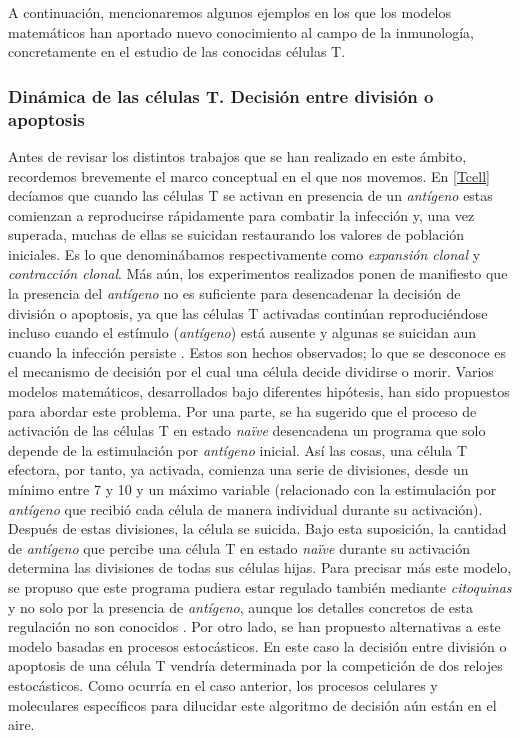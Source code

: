 A continuación, mencionaremos algunos ejemplos en los que los modelos matemáticos han aportado nuevo conocimiento al campo de la inmunología, concretamente en el estudio de las conocidas células T. 


\subsubsection{Dinámica de las células T. Decisión entre división o apoptosis}
\label{cuestionAmodelizar}

Antes de revisar los distintos trabajos que se han realizado en este ámbito, recordemos brevemente el marco conceptual en el que nos movemos. En \ref{Tcell} decíamos que cuando las células T se activan en presencia de un \textit{antígeno} estas comienzan a reproducirse rápidamente para combatir la infección y, una vez superada, muchas de ellas se suicidan restaurando los valores de población iniciales. Es lo que denominábamos respectivamente como \textit{expansión clonal} y \textit{contracción clonal}. Más aún, los experimentos realizados ponen de manifiesto que la presencia del \textit{antígeno} no es suficiente para desencadenar la decisión de división o apoptosis, ya que las células T activadas continúan reproduciéndose incluso cuando el estímulo (\textit{antígeno}) está ausente y algunas se suicidan aun cuando la infección persiste \citep{JTB}. Estos son hechos observados; lo que se desconoce es el mecanismo de decisión por el cual una célula decide dividirse o morir. Varios modelos matemáticos, desarrollados bajo diferentes hipótesis, han sido propuestos para abordar este problema. Por una parte, se ha sugerido que el proceso de activación de las células T en estado \textit{naïve} desencadena un programa que solo depende de la estimulación por \textit{antígeno} inicial. Así las cosas, una célula T efectora, por tanto, ya activada, comienza una serie de divisiones, desde un mínimo entre 7 y 10 y un máximo variable (relacionado con la estimulación por \textit{antígeno} que recibió cada célula de manera individual durante su activación). Después de estas divisiones, la célula se suicida. Bajo esta suposición, la cantidad de \textit{antígeno} que percibe una célula T en estado \textit{naïve} durante su activación determina las divisiones de todas sus células hijas. Para precisar más este modelo, se propuso que este programa pudiera estar regulado también mediante \textit{citoquinas} y no solo por la presencia de \textit{antígeno}, aunque los detalles concretos de esta regulación no son conocidos \citep{JTB}. Por otro lado, se han propuesto alternativas a este modelo basadas en procesos estocásticos. En este caso la decisión entre división o apoptosis de una célula T vendría determinada por la competición de dos relojes estocásticos. Como ocurría en el caso anterior, los procesos celulares y moleculares específicos para dilucidar este algoritmo de decisión aún están en el aire. 

